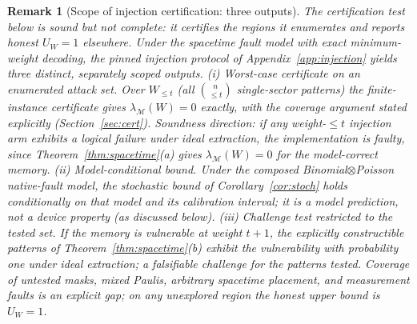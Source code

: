 \documentclass[pdflatex,sn-mathphys-num]{sn-jnl}
\theoremstyle{thmstyleone}
\theoremstyle{thmstyletwo}
\newtheorem{remark}{Remark}
\theoremstyle{thmstylethree}
\begin{document}
\begin{remark}[Scope of injection certification: three outputs]\label{cor:inj-cert}
The certification test below is sound but not complete: it certifies the regions it enumerates and reports honest $U_W=1$ elsewhere. Under the spacetime fault model with exact minimum-weight decoding, the pinned injection protocol of Appendix~\ref{app:injection} yields three distinct, separately scoped outputs. \emph{(i) Worst-case certificate on an enumerated attack set.} Over $W_{\le t}$ (all $\binom{n}{\le t}$ single-sector patterns) the finite-instance certificate gives $\lambda_{\mathcal{M}}(W)=0$ exactly, with the coverage argument stated explicitly (Section~\ref{sec:cert}). Soundness direction: if any weight-$\le t$ injection arm exhibits a logical failure under ideal extraction, the implementation is faulty, since Theorem~\ref{thm:spacetime}(a) gives $\lambda_{\mathcal{M}}(W)=0$ for the model-correct memory. \emph{(ii) Model-conditional bound.} Under the composed Binomial$\otimes$Poisson native-fault model, the stochastic bound of Corollary~\ref{cor:stoch} holds conditionally on that model and its calibration interval; it is a model prediction, not a device property (as discussed below). \emph{(iii) Challenge test restricted to the tested set.} If the memory is vulnerable at weight $t{+}1$, the explicitly constructible patterns of Theorem~\ref{thm:spacetime}(b) exhibit the vulnerability with probability one under ideal extraction; a falsifiable challenge for the patterns tested. Coverage of untested masks, mixed Paulis, arbitrary spacetime placement, and measurement faults is an explicit gap; on any unexplored region the honest upper bound is $U_W=1$.
\end{remark}
\end{document}

